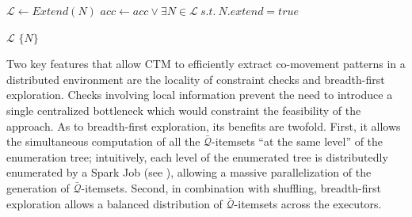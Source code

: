 \documentclass[
]{ceurart}
\begin{document}
\begin{algorithm}[t]
\begin{algorithmic}[1]
        \State $\mathcal{L} \gets Extend(N)$                                       \label{alg:dist17}
        \State $acc \gets acc\vee\exists N \in \mathcal{L}~s.t.~N.extend = true$  \label{alg:dist18}
        \item[] 
        \State \Return $\mathcal{L}$                                               \label{alg:dist19}
        \Else {}                                                                     \label{alg:dist20}
        \State \Return $\{ N \}$                                                   \label{alg:dist21}
        \EndIf
    \EndFunction
\end{algorithmic}
\end{algorithm}

Two key features that allow CTM to efficiently extract co-movement patterns in a distributed environment are the locality of constraint checks and breadth-first exploration.
Checks involving local information prevent the need to introduce a single centralized bottleneck which would constraint the feasibility of the approach.
As to breadth-first exploration, its benefits are twofold.
First, it allows the simultaneous computation of all the $\bar{\mathcal{Q}}$-itemsets ``at the same level'' of the enumeration tree; intuitively, each level of the enumerated tree is distributedly enumerated by a Spark Job (see ), allowing a massive parallelization of the generation of $\bar{\mathcal{Q}}$-itemsets.
Second, in combination with shuffling, breadth-first exploration allows a balanced distribution of $\bar{\mathcal{Q}}$-itemsets across the executors.
\end{document}

